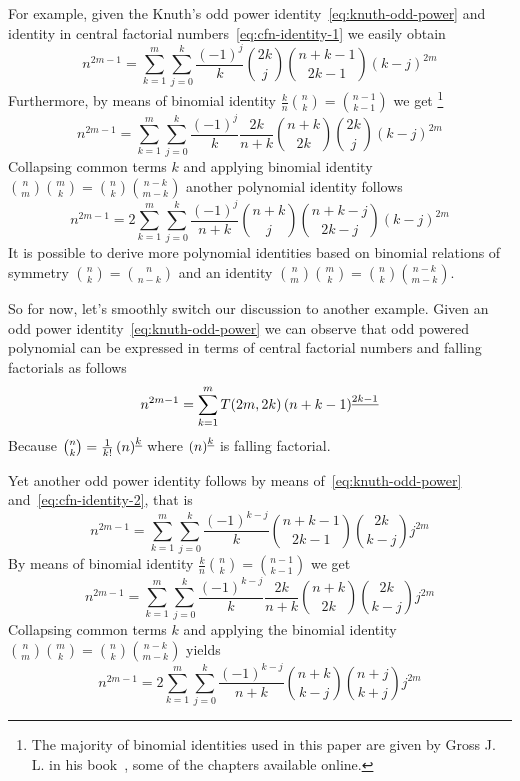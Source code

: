 For example, given the Knuth's odd power identity~\eqref{eq:knuth-odd-power}
and identity in central factorial numbers~\eqref{eq:cfn-identity-1}
we easily obtain
\begin{equation*}
    n^{2m-1} = \sum_{k=1}^{m} \sum_{j=0}^{k} \frac{(-1)^j}{k} \binom{2k}{j} \binom{n+k-1}{2k-1} (k-j)^{2m}
\end{equation*}
Furthermore, by means of binomial identity $\frac{k}{n} \binom{n}{k} = \binom{n-1}{k-1}$ we get
\footnote{The majority of binomial identities used in this paper are given by Gross J. L.
in his book~\cite{gross2016combinatorial}, some of the chapters available online.}
\begin{equation*}
    n^{2m-1} = \sum_{k=1}^{m} \sum_{j=0}^{k} \frac{(-1)^{j}}{k} \frac{2k}{n+k} \binom{n+k}{2k} \binom{2k}{j} (k-j)^{2m}
\end{equation*}
Collapsing common terms $k$ and applying binomial identity $\binom{n}{m} \binom{m}{k} = \binom{n}{k} \binom{n-k}{m-k}$
another polynomial identity follows
\begin{equation*}
    n^{2m-1} = 2\sum_{k=1}^{m} \sum_{j=0}^{k} \frac{(-1)^{j}}{n+k} \binom{n+k}{j} \binom{n+k-j}{2k-j} (k-j)^{2m}
\end{equation*}
It is possible to derive more polynomial identities based on binomial relations of symmetry $\binom{n}{k} = \binom{n}{n-k}$
and an identity $\binom{n}{m} \binom{m}{k} = \binom{n}{k} \binom{n-k}{m-k}$.

So for now, let's smoothly switch our discussion to another example.
Given an odd power identity~\eqref{eq:knuth-odd-power} we can observe that odd powered polynomial can be expressed in terms of
central factorial numbers and falling factorials as follows
\begin{equation*}
    n^{2m-1} = \sum_{k=1}^{m} T(2m,2k) \left(n+k-1 \right)^{\underline{2k-1}}
\end{equation*}
Because $\binom{n}{k} = \frac{1}{k!} \left(n \right)^{\underline{k}}$ where $\left(n \right)^{\underline{k}}$ is falling factorial.

Yet another odd power identity follows by means of~\eqref{eq:knuth-odd-power} and~\eqref{eq:cfn-identity-2}, that is
\begin{equation*}
    n^{2m-1} = \sum_{k=1}^{m} \sum_{j=0}^{k} \frac{(-1)^{k-j}}{k} \binom{n+k-1}{2k-1} \binom{2k}{k-j} j^{2m}
\end{equation*}
By means of binomial identity $\frac{k}{n} \binom{n}{k} = \binom{n-1}{k-1}$ we get
\begin{equation*}
    n^{2m-1} = \sum_{k=1}^{m} \sum_{j=0}^{k} \frac{(-1)^{k-j}}{k} \frac{2k}{n+k} \binom{n+k}{2k} \binom{2k}{k-j} j^{2m}
\end{equation*}
Collapsing common terms $k$ and applying the binomial identity
$\binom{n}{m} \binom{m}{k} = \binom{n}{k} \binom{n-k}{m-k}$ yields
\begin{equation*}
    n^{2m-1} = 2\sum_{k=1}^{m} \sum_{j=0}^{k} \frac{(-1)^{k-j}}{n+k} \binom{n+k}{k-j} \binom{n+j}{k+j} j^{2m}
\end{equation*}

